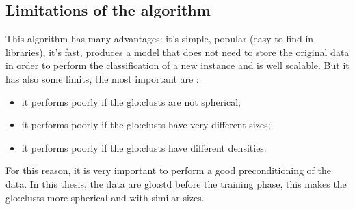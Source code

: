 \subsection{Limitations of the algorithm}
\label{sec:kmeans_limits}
This algorithm has many advantages: it's simple, popular (easy to find in libraries), it's fast, produces a model that does not need to store the original data in order to perform the classification of a new instance and is well scalable. But it has also some limits, the most important are :
\begin{itemize}
  \item it performs poorly if the \gls{glo:clust}s are not spherical;
  \item it performs poorly if the \gls{glo:clust}s have very different sizes;
  \item it performs poorly if the \gls{glo:clust}s have different densities.
\end{itemize}

For this reason, it is very important to perform a good preconditioning of the data. In this thesis, the data are \gls{glo:std} before the training phase, this makes the \gls{glo:clust}s more spherical and with similar sizes. 



